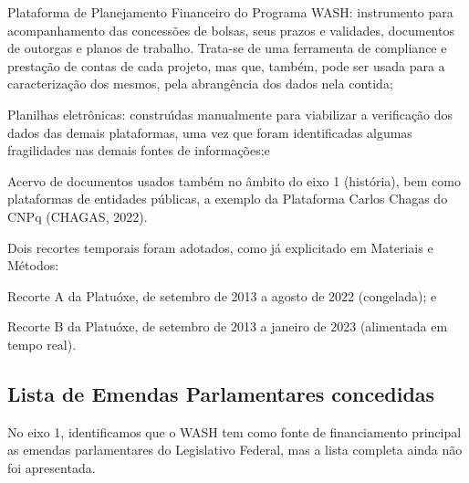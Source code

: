 \documentclass[
12pt,		%
openright,	%
twoside,  %
a4paper,			%
chapter=TITLE,		%
english,			%
french,				%
spanish,			%
brazil				%
]{USPSC-classe/USPSC}
\begin{document}
\begin{alineas}
\item Plataforma de Planejamento Financeiro do Programa WASH: instrumento para acompanhamento das concess\~oes de bolsas, seus prazos e validades, documentos de outorgas e planos de trabalho. Trata-se de uma ferramenta de compliance e presta\c{c}\~ao de contas de cada projeto, mas que, tamb\'em, pode ser usada para a caracteriza\c{c}\~ao dos mesmos, pela abrang\^encia dos dados nela contida;
\item Planilhas eletr\^onicas: constru\'{\i}das  manualmente para viabilizar a verifica\c{c}\~ao dos dados das demais plataformas, uma vez que foram identificadas algumas fragilidades nas demais fontes de informa\c{c}\~oes;e

\item Acervo de documentos usados tamb\'em no \^ambito do eixo 1 (hist\'oria), bem como plataformas de entidades p\'ublicas, a exemplo da Plataforma Carlos Chagas do CNPq  (CHAGAS, 2022).
\end{alineas}

Dois recortes temporais foram adotados, como j\'a explicitado em Materiais e M\'etodos:


















\begin{alineas}
\item Recorte A da Platu\'oxe, de setembro de 2013 a agosto de 2022 (congelada); e
\item Recorte B da Platu\'oxe, de setembro de 2013 a janeiro de 2023 (alimentada em tempo real).
\end{alineas}

\subsection[Lista de Emendas Parlamentares concedidas]{Lista de Emendas Parlamentares concedidas}\label{Lista de Emendas Parlamentares concedidas}
No eixo 1, identificamos que o WASH tem como fonte de financiamento principal as emendas parlamentares do Legislativo Federal, mas a lista completa ainda n\~ao foi apresentada.
\end{document}

